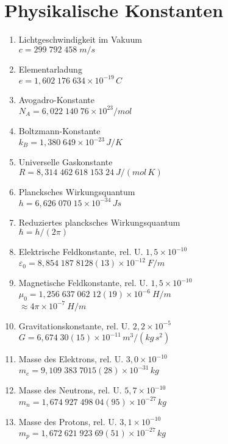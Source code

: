 \section{Physikalische Konstanten}
\begin{enumerate}
\item Lichtgeschwindigkeit im Vakuum\\
$c=299\;792\;458\;\unit{m/s}$

\item Elementarladung\\
$e = 1{,}602\;176\;634\times 10^{-19}\,\unit{C}$

\item Avogadro-Konstante\\
$N_A = 6{,}022\;140\;76\times 10^{23}/\unit{mol}$

\item Boltzmann-Konstante\\
$k_B = 1{,}380\;649\times 10^{-23}\,\unit{J/K}$

\item Universelle Gaskonstante\\
$R = 8{,}314\;462\;618\;153\;24\:\unit{J/(mol\,K)}$

\item Plancksches Wirkungsquantum\\
$h = 6{,}626\;070\;15\times 10^{-34}\,\unit{Js}$

\item Reduziertes plancksches Wirkungsquantum\\
$\hbar = h/(2\pi)$

\item Elektrische Feldkonstante, rel. U. $1{,}5\times 10^{-10}$\\
$\varepsilon_0 = 8{,}854\;187\;8128(13)\times 10^{-12}\:\unit{F/m}$

\item Magnetische Feldkonstante, rel. U. $1{,}5\times 10^{-10}$\\
$\mu_0 = 1{,}256\;637\;062\;12(19)\times 10^{-6}\:\unit{H/m}$\\
$\approx 4\pi\times 10^{-7}\:\unit{H/m}$

\item Gravitationskonstante, rel. U. $2{,}2\times 10^{-5}$\\
$G = 6{,}674\;30(15)\times 10^{-11}\,\unit{m^3/(kg\,s^2)}$

\item Masse des Elektrons, rel. U. $3{,}0\times 10^{-10}$\\
$m_e = 9{,}109\;383\;7015(28)\times 10^{-31}\,\unit{kg}$

\item Masse des Neutrons, rel. U. $5{,}7\times 10^{-10}$\\
$m_n = 1{,}674\;927\;498\;04(95)\times 10^{-27}\,\unit{kg}$

\item Masse des Protons, rel. U. $3{,}1\times 10^{-10}$\\
$m_p = 1{,}672\;621\;923\;69(51)\times 10^{-27}\,\unit{kg}$

\end{enumerate}

